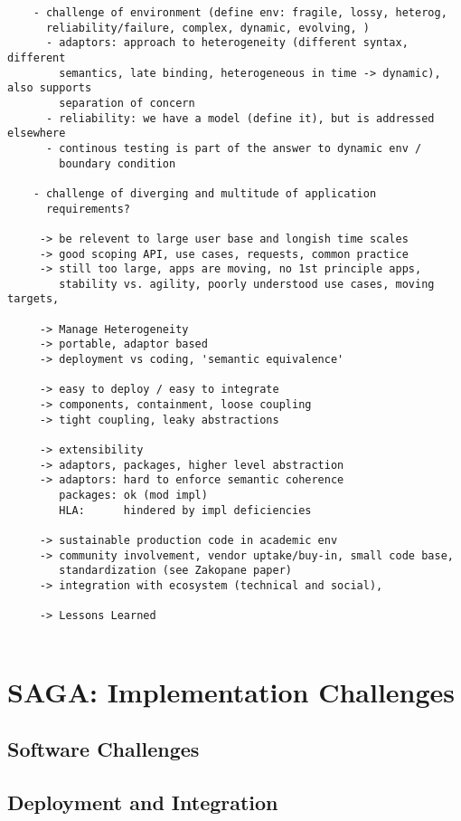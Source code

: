 \documentclass[a4paper,10pt]{article}
\begin{document}
  \begin{verbatim}
    - challenge of environment (define env: fragile, lossy, heterog,
      reliability/failure, complex, dynamic, evolving, ) 
      - adaptors: approach to heterogeneity (different syntax, different
        semantics, late binding, heterogeneous in time -> dynamic), also supports 
        separation of concern
      - reliability: we have a model (define it), but is addressed elsewhere
      - continous testing is part of the answer to dynamic env /
        boundary condition

    - challenge of diverging and multitude of application
      requirements?

     -> be relevent to large user base and longish time scales
     -> good scoping API, use cases, requests, common practice
     -> still too large, apps are moving, no 1st principle apps,
        stability vs. agility, poorly understood use cases, moving targets, 

     -> Manage Heterogeneity
     -> portable, adaptor based
     -> deployment vs coding, 'semantic equivalence'
  
     -> easy to deploy / easy to integrate
     -> components, containment, loose coupling
     -> tight coupling, leaky abstractions
  
     -> extensibility
     -> adaptors, packages, higher level abstraction
     -> adaptors: hard to enforce semantic coherence
        packages: ok (mod impl)
        HLA:      hindered by impl deficiencies
  
     -> sustainable production code in academic env
     -> community involvement, vendor uptake/buy-in, small code base,
        standardization (see Zakopane paper)
     -> integration with ecosystem (technical and social), 
  
     -> Lessons Learned
  
  \end{verbatim}


\section{SAGA: Implementation Challenges}

\subsection{Software Challenges}

\subsection{Deployment and Integration} 
\end{document}
